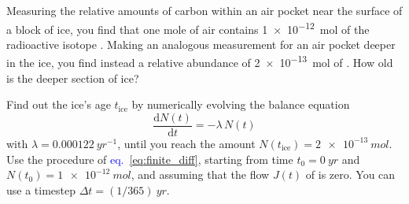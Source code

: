 \documentclass[a4paper,12pt,%
onecolumn,oneside,titlepage,%
british%
]{memoir}
\newcommand*{\di}{\mathrm{d}}%
\newcommand*{\incr}{\Delta}%
\renewcommand*{\|}[1][]{\nonscript\:#1\vert\nonscript\:\mathopen{}}
\newcommand*{\sect}{\S}%
\newcommand*{\eqn}{eq.}%
\renewcommand*{\autoref}[2]{\sidepar{\vspace{-1ex}\footnotesize{\color{blue}\faIcon{%
reply%
}\enspace\sect\,\ref{#1} page\,\pageref{#1}}}\textcolor{blue}{#2}}
\newcommand*{\yN}{N}
\newcommand*{\yJ}{J}
\newcommand*{\yti}{t_{0}}
\newcommand*{\Dt}{\incr t}
\begin{document}
%
%
\begin{exercise}
  Measuring the relative amounts of carbon within an air pocket near the surface of a block of ice, you find that one mole of air contains \qty[print-unity-mantissa=false]{1e-12}{mol} of the radioactive isotope . Making an analogous measurement for an air pocket deeper in the ice, you find instead a relative abundance of \qty{2e-13}{mol} of . How old is the deeper section of ice?

  Find out the ice's age $t_{\text{ice}}$ by numerically evolving the balance equation
  $$\frac{\di\yN(t)}{\di t} = -\lambda\,\yN(t)$$
  with $\lambda=\qty{0.000122}{yr^{-1}}$, until you reach the amount $\yN(t_{\text{ice}})= \qty{2e-13}{mol}$.
  Use the procedure of \autoref{sec:numeric_simulation}{\eqn~\eqref{eq:finite_diff}}, starting from time $\yti=\qty{0}{yr}$ and $\yN(\yti)=\qty[print-unity-mantissa=false]{1e-12}{mol}$, and assuming that the flow $\yJ(t)$ of  is zero. You can use a timestep $\Dt = (1/365)\:\unit{yr}$.
\end{exercise}
\end{document}
